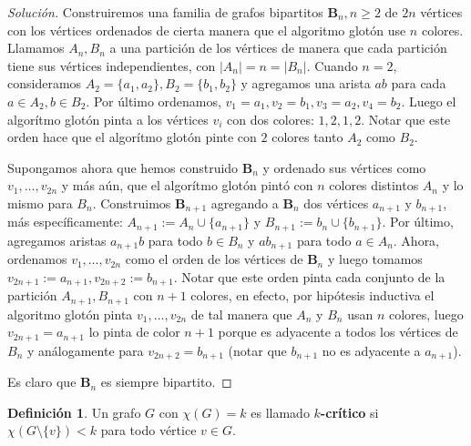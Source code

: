 \documentclass[12pt]{report}
\theoremstyle{plain}
\theoremstyle{definition}
\newtheorem{definition}[theorem]{Definición}
\newenvironment{solution}{\begin{proof}[Solución]}{\end{proof}}
\newcommand{\abs}[1]{\left \vert #1 \right \vert}
\begin{document}
\begin{solution}
Construiremos una familia de grafos bipartitos $\mathbf{B}_n, n \geq 2$ de $2n$ vértices con los vértices ordenados de cierta manera que el algoritmo glotón use $n$ colores. Llamamos $A_n, B_n$ a una partición de los vértices de manera que cada partición tiene sus vértices independientes, con $\abs {A_n} = n = \abs {B_n}$. Cuando $n = 2$, consideramos $A_2 = \{a_1, a_2\}, B_2 = \{b_1, b_2\}$ y agregamos una arista $ab$ para cada $a \in A_2, b \in B_2$. Por último ordenamos, $v_1 = a_1, v_2 = b_1, v_3 = a_2, v_4 = b_2$. Luego el algorítmo glotón pinta a los vértices $v_i$ con dos colores: $1,2,1,2$. Notar que este orden hace que el algorítmo glotón pinte con $2$ colores tanto $A_2$ como $B_2$.

Supongamos ahora que hemos construido $\mathbf{B}_n$ y ordenado sus vértices como $v_1, \ldots, v_{2n}$ y más aún, que el algorítmo glotón pintó con $n$ colores distintos $A_n$ y lo mismo para $B_n$. Construimos $\mathbf{B}_{n+1}$ agregando a $\mathbf{B}_{n}$ dos vértices $a_{n+1}$ y $b_{n+1}$, más específicamente: $A_{n+1} := A_n \cup \{a_{n+1}\}$ y $B_{n+1} := b_n \cup \{b_{n+1} \}$. Por último, agregamos aristas $a_{n+1} b$ para todo $b \in B_n$ y $a b_{n+1}$ para todo $a \in A_n$. Ahora, ordenamos $v_1, \ldots, v_{2n}$ como el orden de los vértices de $\mathbf{B}_n$ y luego tomamos $v_{2n+1} := a_{n+1}, v_{2n+2} := b_{n+1}$. Notar que este orden pinta cada conjunto de la partición $A_{n+1}, B_{n+1}$ con $n + 1$ colores, en efecto, por hipótesis inductiva el algoritmo glotón pinta $v_1, \ldots, v_{2n}$ de tal manera que $A_n$ y $B_n$ usan $n$ colores, luego $v_{2n + 1 } = a_{n+1}$ lo pinta de color $n+1$ porque es adyacente a todos los vértices de $B_n$ y análogamente para $v_{2n + 2} = b_{n+1}$ (notar que $b_{n+1}$ no es adyacente a $a_{n+1}$).

Es claro que $\mathbf{B}_n$ es siempre bipartito.
\end{solution}

\begin{definition}
Un grafo $G$ con $\chi (G) = k$ es llamado \textbf{$k$-crítico} si $\chi (G \setminus \{v\})< k$ para todo vértice $v \in G$.
\end{definition}
\end{document}
